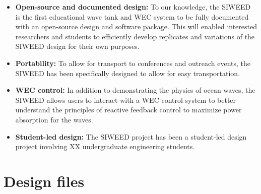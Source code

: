 \documentclass[11pt, letterpaper]{article}
\begin{document}
\begin{itemize}
  \item \textbf{Open-source and documented design:} To our knowledge, the SIWEED is the first educational wave tank and WEC system to be fully documented with an open-source design and software package.
  This will enabled interested researchers and students to efficiently develop replicates and variations of the SIWEED design for their own purposes.
  \item \textbf{Portability:} To allow for transport to conferences and outreach events, the SIWEED has been specifically designed to allow for easy transportation.
  \item \textbf{WEC control:} In addition to demonstrating the physics of ocean waves, the SIWEED allows users to interact with a WEC control system to better understand the principles of reactive feedback control to maximize power absorption for the waves.
  \item \textbf{Student-led design:} The SIWEED project has been a student-led design project involving XX undergraduate engineering students.
\end{itemize}

\section{Design files}
\end{document}
